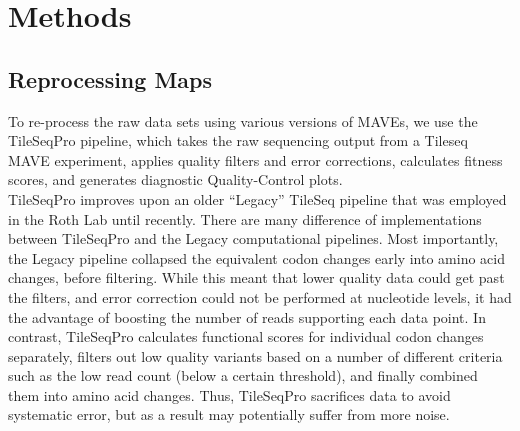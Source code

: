 \documentclass{article}
\begin{document}
\section{Methods} %
\subsection{Reprocessing Maps} 
To re-process the raw data sets using various versions of MAVEs, we use the TileSeqPro pipeline, which takes the raw sequencing output from a Tileseq MAVE experiment, applies quality filters and error corrections, calculates fitness scores, and generates diagnostic Quality-Control plots. \\ 

TileSeqPro improves upon an older ``Legacy'' TileSeq pipeline that was employed in the Roth Lab until recently.
There are many difference of implementations between TileSeqPro and the Legacy computational pipelines. Most importantly, the Legacy pipeline collapsed the equivalent codon changes early into amino acid changes, before filtering. While this meant that lower quality data could get past the filters, and error correction could not be performed at nucleotide levels, it had the advantage of boosting the number of reads supporting each data point. In contrast, TileSeqPro calculates functional scores for individual codon changes separately, filters out low quality variants based on a number of different criteria such as the low read count (below a certain threshold), and finally combined them into amino acid changes. Thus, TileSeqPro sacrifices data to avoid systematic error, but as a result may potentially suffer from more noise.  
\end{document}
